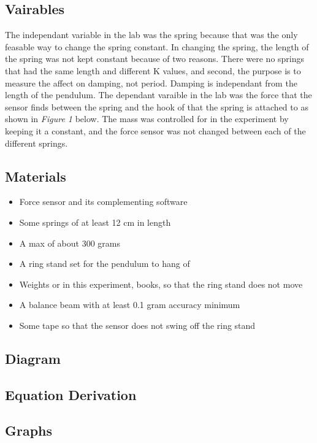 \documentclass{report}
\begin{document}
\subsection*{Vairables}
\indent The independant variable in the lab was the spring because that was the only feasable way to change the spring constant. In changing the spring, the length of the spring was not kept constant because of two reasons. There were no springs that had the same length and different K values, and second, the purpose is to measure the affect on damping, not period. Damping is independant from the length of the pendulum. The dependant varaible in the lab was the force that the sensor finds between the spring and the hook of that the spring is attached to as shown in \textit{Figure 1} below. The mass was controlled for in the experiment by keeping it a constant, and the force sensor was not changed between each of the different springs.

\subsection*{Materials}
\begin{itemize}
\item Force sensor and its complementing software
\item Some springs of at least 12 cm in length
\item A max of about 300 grams
\item A ring stand set for the pendulum to hang of
\item Weights or in this experiment, books, so that the ring stand does not move
\item A balance beam with at least 0.1 gram accuracy minimum
\item Some tape so that the sensor does not swing off the ring stand
\end{itemize}

\subsection*{Diagram}

\subsection*{Equation Derivation}

\subsection*{Graphs}
\end{document}
